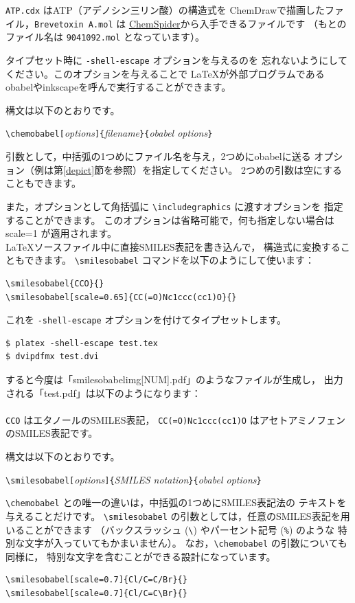 \documentclass[12pt]{ltjsarticle}
\begin{document}
\verb|ATP.cdx| はATP（アデノシン三リン酸）の構造式を
ChemDrawで描画したファイル，\verb|Brevetoxin A.mol| は
\href{http://www.chemspider.com/}{ChemSpider}から入手できるファイルです
（もとのファイル名は \verb|9041092.mol| となっています）。

タイプセット時に \verb|-shell-escape| オプションを与えるのを
忘れないようにしてください。このオプションを与えることで
\LaTeX が外部プログラムであるobabelやinkscapeを呼んで実行することができます。

構文は以下のとおりです。
\begin{center}
\verb|\chemobabel[|\textit{options}\verb|]{|\textit{filename}\verb|}{|\textit{obabel options}\verb|}|
\end{center}
引数として，中括弧の1つめにファイル名を与え，2つめにobabelに送る
オプション（例は第\ref{depict}節を参照）を指定してください。
2つめの引数は空にすることもできます。

また，オプションとして角括弧に \verb|\includegraphics| に渡すオプションを
指定することができます。
このオプションは省略可能で，何も指定しない場合は scale=1 が適用されます。 \\

\LaTeX ソースファイル中に直接SMILES表記を書き込んで，
構造式に変換することもできます。
\verb|\smilesobabel| コマンドを以下のようにして使います：
\begin{verbatim}
\smilesobabel{CCO}{}
\smilesobabel[scale=0.65]{CC(=O)Nc1ccc(cc1)O}{}
\end{verbatim}
これを \verb|-shell-escape| オプションを付けてタイプセットします。
\begin{verbatim}
$ platex -shell-escape test.tex
$ dvipdfmx test.dvi
\end{verbatim}
すると今度は「smilesobabelimg[NUM].pdf」のようなファイルが生成し，
出力される「test.pdf」は以下のようになります： \\
 \\
\verb|CCO| はエタノールのSMILES表記，
\verb|CC(=O)Nc1ccc(cc1)O| はアセトアミノフェンのSMILES表記です。

構文は以下のとおりです。
\begin{center}
\verb|\smilesobabel[|\textit{options}\verb|]{|\textit{SMILES notation}\verb|}{|\textit{obabel options}\verb|}|
\end{center}
\verb|\chemobabel| との唯一の違いは，中括弧の1つめにSMILES表記法の
テキストを与えることだけです。
\verb|\smilesobabel| の引数としては，任意のSMILES表記を用いることができます
（バックスラッシュ (\verb|\|) やパーセント記号 (\verb|%|) のような
特別な文字が入っていてもかまいません）。
なお，\verb|\chemobabel| の引数についても同様に，
特別な文字を含むことができる設計になっています。
\begin{verbatim}
\smilesobabel[scale=0.7]{Cl/C=C/Br}{}
\smilesobabel[scale=0.7]{Cl/C=C\Br}{}
\end{verbatim}
\end{document}
